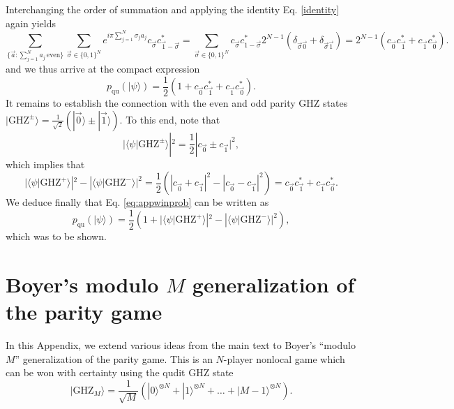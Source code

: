 \documentclass[prb,twocolumn,showpacs,amssymb,superscriptaddress]{revtex4-2}
\begin{document}
Interchanging the order of summation and applying the identity Eq. \eqref{identity} again yields
\begin{equation}
\sum_{\{\vec{a}:\sum_{j=1}^N a_j \, \mathrm{even}\}} \sum_{\vec{\sigma}\in \{0,1\}^N} e^{i\pi \sum_{j=1}^N \sigma_j a_j}c_{\vec{\sigma}}c^*_{\vec{1}-\vec{\sigma}} = \sum_{\vec{\sigma}\in \{0,1\}^N} c_{\vec{\sigma}}c^*_{1-\vec{\sigma}} 2^{N-1}(\delta_{\vec{\sigma}\vec{0}} + \delta_{\vec{\sigma}\vec{1}}) = 2^{N-1} (c_{\vec{0}}c_{\vec{1}}^* + c_{\vec{1}}c_{\vec{0}}^*).
\end{equation}
and we thus arrive at the compact expression
\begin{equation}
\label{eq:appwinprob}
p_{\mathrm{qu}}(|\psi\rangle) = \frac{1}{2}\left(1+ c_{\vec{0}}c_{\vec{1}}^* + c_{\vec{1}}c_{\vec{0}}^*\right).
\end{equation}
It remains to establish the connection with the even and odd parity GHZ states $|\mathrm{GHZ}^{\pm}\rangle = \frac{1}{\sqrt{2}}(|\vec{0}\rangle \pm |\vec{1}\rangle)$. To this end, note that
\begin{equation}
|\langle \psi | \mathrm{GHZ}^{\pm} \rangle|^2 = \frac{1}{2}|c_{\vec{0}} \pm c_{\vec{1}}|^2,
\end{equation}
which implies that
\begin{equation}
|\langle \psi | \mathrm{GHZ}^+ \rangle|^2-|\langle \psi | \mathrm{GHZ}^- \rangle|^2 = \frac{1}{2}(|c_{\vec{0}}+c_{\vec{1}}|^2-|c_{\vec{0}}-c_{\vec{1}}|^2) = c_{\vec{0}}c_{\vec{1}}^*+c_{\vec{1}}c_{\vec{0}}^*.
\end{equation}
We deduce finally that Eq. \eqref{eq:appwinprob} can be written as
\begin{equation}
\label{eq:appthm}
p_{\mathrm{qu}}(|\psi\rangle) = \frac{1}{2}\left(1+ |\langle \psi | \mathrm{GHZ}^+\rangle |^2 -|\langle \psi | \mathrm{GHZ}^-\rangle |^2\right),
\end{equation}
which was to be shown.
\section{Boyer's modulo $M$ generalization of the parity game}
\label{app:Boyer}

In this Appendix, we extend various ideas from the main text to Boyer's ``modulo $M$'' generalization of the parity game\cite{boyer2004extended}. This is an $N$-player nonlocal game which can be won with certainty using the qudit GHZ state
\begin{equation}
|\mathrm{GHZ}_M\rangle = \frac{1}{\sqrt{M}}(|0\rangle^{\otimes N} + |1\rangle^{\otimes N} + \ldots + |M-1\rangle^{\otimes N}).
\end{equation}
\end{document}
